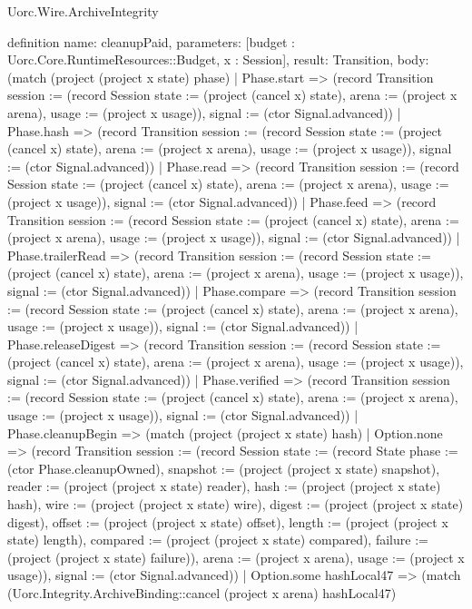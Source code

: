\begin{lexlean}{Uorc.Wire.ArchiveIntegrity}
\begin{semanticmodule}
definition{
  name: cleanupPaid,
  parameters: [budget : Uorc.Core.RuntimeResources::Budget, x : Session],
  result: Transition,
  body: (match (project (project x state) phase)
    | Phase.start => (record Transition {session := (record Session {state := (project (cancel x) state), arena := (project x arena), usage := (project x usage)}), signal := (ctor Signal.advanced)})
    | Phase.hash => (record Transition {session := (record Session {state := (project (cancel x) state), arena := (project x arena), usage := (project x usage)}), signal := (ctor Signal.advanced)})
    | Phase.read => (record Transition {session := (record Session {state := (project (cancel x) state), arena := (project x arena), usage := (project x usage)}), signal := (ctor Signal.advanced)})
    | Phase.feed => (record Transition {session := (record Session {state := (project (cancel x) state), arena := (project x arena), usage := (project x usage)}), signal := (ctor Signal.advanced)})
    | Phase.trailerRead => (record Transition {session := (record Session {state := (project (cancel x) state), arena := (project x arena), usage := (project x usage)}), signal := (ctor Signal.advanced)})
    | Phase.compare => (record Transition {session := (record Session {state := (project (cancel x) state), arena := (project x arena), usage := (project x usage)}), signal := (ctor Signal.advanced)})
    | Phase.releaseDigest => (record Transition {session := (record Session {state := (project (cancel x) state), arena := (project x arena), usage := (project x usage)}), signal := (ctor Signal.advanced)})
    | Phase.verified => (record Transition {session := (record Session {state := (project (cancel x) state), arena := (project x arena), usage := (project x usage)}), signal := (ctor Signal.advanced)})
    | Phase.cleanupBegin => (match (project (project x state) hash)
      | Option.none => (record Transition {session := (record Session {state := (record State {phase := (ctor Phase.cleanupOwned), snapshot := (project (project x state) snapshot), reader := (project (project x state) reader), hash := (project (project x state) hash), wire := (project (project x state) wire), digest := (project (project x state) digest), offset := (project (project x state) offset), length := (project (project x state) length), compared := (project (project x state) compared), failure := (project (project x state) failure)}), arena := (project x arena), usage := (project x usage)}), signal := (ctor Signal.advanced)})
      | Option.some hashLocal47 => (match (Uorc.Integrity.ArchiveBinding::cancel (project x arena) hashLocal47)
}
\end{semanticmodule}
\end{lexlean}
